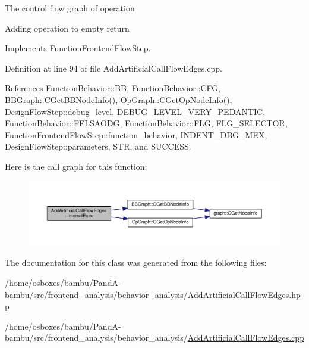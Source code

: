 The control flow graph of operation

Adding operation to empty return 

Implements \hyperlink{classFunctionFrontendFlowStep_a00612f7fb9eabbbc8ee7e39d34e5ac68}{Function\+Frontend\+Flow\+Step}.



Definition at line 94 of file Add\+Artificial\+Call\+Flow\+Edges.\+cpp.



References Function\+Behavior\+::\+BB, Function\+Behavior\+::\+C\+FG, B\+B\+Graph\+::\+C\+Get\+B\+B\+Node\+Info(), Op\+Graph\+::\+C\+Get\+Op\+Node\+Info(), Design\+Flow\+Step\+::debug\+\_\+level, D\+E\+B\+U\+G\+\_\+\+L\+E\+V\+E\+L\+\_\+\+V\+E\+R\+Y\+\_\+\+P\+E\+D\+A\+N\+T\+IC, Function\+Behavior\+::\+F\+F\+L\+S\+A\+O\+DG, Function\+Behavior\+::\+F\+LG, F\+L\+G\+\_\+\+S\+E\+L\+E\+C\+T\+OR, Function\+Frontend\+Flow\+Step\+::function\+\_\+behavior, I\+N\+D\+E\+N\+T\+\_\+\+D\+B\+G\+\_\+\+M\+EX, Design\+Flow\+Step\+::parameters, S\+TR, and S\+U\+C\+C\+E\+SS.

Here is the call graph for this function\+:
\nopagebreak
\begin{figure}[H]
\begin{center}
\leavevmode
\includegraphics[width=350pt]{d8/d4f/classAddArtificialCallFlowEdges_af8c77aa64aec79e8f541b6c9d681f786_cgraph}
\end{center}
\end{figure}


The documentation for this class was generated from the following files\+:\begin{DoxyCompactItemize}
\item 
/home/osboxes/bambu/\+Pand\+A-\/bambu/src/frontend\+\_\+analysis/behavior\+\_\+analysis/\hyperlink{AddArtificialCallFlowEdges_8hpp}{Add\+Artificial\+Call\+Flow\+Edges.\+hpp}\item 
/home/osboxes/bambu/\+Pand\+A-\/bambu/src/frontend\+\_\+analysis/behavior\+\_\+analysis/\hyperlink{AddArtificialCallFlowEdges_8cpp}{Add\+Artificial\+Call\+Flow\+Edges.\+cpp}\end{DoxyCompactItemize}
